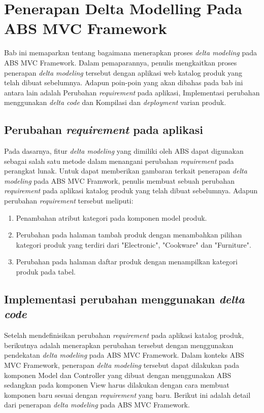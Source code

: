 \chapter{Penerapan Delta Modelling Pada ABS MVC Framework}

Bab ini memaparkan tentang bagaimana menerapkan proses \textit{delta modeling} pada ABS MVC Framework. Dalam pemaparannya, penulis mengkaitkan proses penerapan \textit{delta modeling} tersebut dengan aplikasi web katalog produk yang telah dibuat sebelumnya. Adapun poin-poin yang akan dibahas pada bab ini antara lain adalah Perubahan \textit{requirement} pada aplikasi, Implementasi perubahan menggunakan \textit{delta code} dan Kompilasi dan \textit{deployment} varian produk.

\section{Perubahan \textit{requirement} pada aplikasi}
Pada dasarnya, fitur \textit{delta modeling} yang dimiliki oleh ABS dapat digunakan sebagai salah satu metode dalam menangani perubahan \textit{requirement} pada perangkat lunak. Untuk dapat memberikan gambaran terkait penerapan \textit{delta modeling} pada ABS MVC Framwork, penulis membuat sebuah perubahan \textit{requirement} pada aplikasi katalog produk yang telah dibuat sebelumnya. Adapun perubahan \textit{requirement} tersebut meliputi:

\begin{enumerate}
    \item Penambahan atribut kategori pada komponen model produk.
    \item Perubahan pada halaman tambah produk dengan menambahkan pilihan kategori produk yang terdiri dari "Electronic", "Cookware" dan "Furniture".
    \item Perubahan pada halaman daftar produk dengan menampilkan kategori produk pada tabel.
\end{enumerate}

\section{Implementasi perubahan menggunakan \textit{delta code}}
Setelah mendefinisikan perubahan \textit{requirement} pada aplikasi katalog produk, berikutnya adalah menerapkan perubahan tersebut dengan menggunakan pendekatan \textit{delta modeling} pada ABS MVC Framework. Dalam konteks ABS MVC Framework, penerapan \textit{delta modeling} tersebut dapat dilakukan pada komponen Model dan Controller yang dibuat dengan menggunakan ABS sedangkan pada komponen View harus dilakukan dengan cara membuat komponen baru sesuai dengan \textit{requirement} yang baru. Berikut ini adalah detail dari penerapan \textit{delta modeling} pada ABS MVC Framework.

